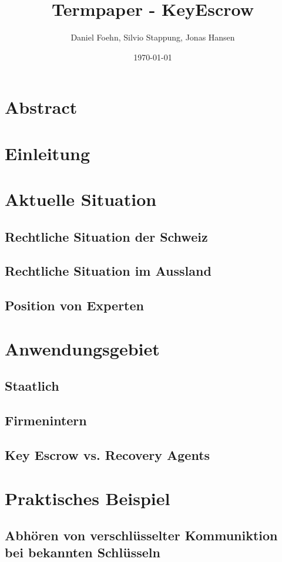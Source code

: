 \documentclass[a4paper, 10pt, fleqn]{article}
\title{Termpaper - KeyEscrow}
\author{Daniel Foehn, Silvio Stappung, Jonas Hansen}
\date{\today} %
\begin{document}
\maketitle
\tableofcontents
\listoffigures
\listoftables
\clearpage
\section{Abstract}
\clearpage
\section{Einleitung}
\clearpage
\section{Aktuelle Situation}
	\subsection{Rechtliche Situation der Schweiz}
	\subsection{Rechtliche Situation im Aussland}
	\subsection{Position von Experten}
	
\clearpage
\section{Anwendungsgebiet}
	\subsection{Staatlich}
	\subsection{Firmenintern}
	\subsection{Key Escrow vs. Recovery Agents}
\clearpage
\section{Praktisches Beispiel}
	\subsection{Abhören von verschlüsselter Kommuniktion bei bekannten Schlüsseln}
\end{document}

